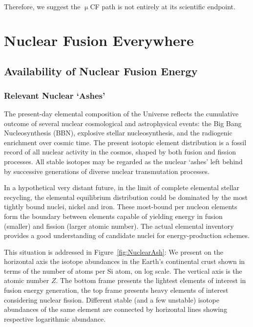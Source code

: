 \documentclass[particles,article,accept,pdftex,moreauthors]{Definitions/mdpi}
\begin{document}
Therefore, we suggest the $\upmu$CF path is not entirely at its scientific endpoint.

\section{Nuclear Fusion Everywhere}\label{sec:Fusion}
\subsection{Availability of Nuclear Fusion Energy}\label{ssec:Nenergy}
\subsubsection{Relevant Nuclear `Ashes'}\label{sssec:NuclearAshes}
The present-day elemental composition of the Universe reflects the cumulative outcome of several nuclear cosmological and astrophysical events: the Big Bang Nucleosynthesis (BBN), explosive stellar nucleosynthesis, and the radiogenic enrichment over cosmic time. The present isotopic element distribution is a fossil record of all nuclear activity in the cosmos, shaped by both fusion and fission processes. All stable isotopes may be regarded as the nuclear `ashes' left behind by successive generations of diverse nuclear transmutation processes.

In a hypothetical very distant future, in the limit of complete elemental stellar recycling, the elemental equilibrium distribution could be dominated by the most tightly bound nuclei, nickel and iron. These most-bound per nucleon elements form the boundary between elements capable of yielding energy in fusion (smaller) and fission (larger atomic number). The actual elemental inventory provides a good understanding of candidate nuclei for energy-production schemes.

This situation is addressed in Figure~\ref{fig:NuclearAsh}: We present on the horizontal axis the isotope abundances in the Earth's continental crust shown in terms of the number of atoms per Si atom, on log scale. The vertical axis is the atomic number $Z$. The bottom frame presents the lightest elements of interest in fusion energy generation, the top frame presents heavy elements of interest considering nuclear fission. Different stable (and a few unstable) isotope abundances of the same element are connected by horizontal lines showing respective logarithmic abundance.
\end{document}
